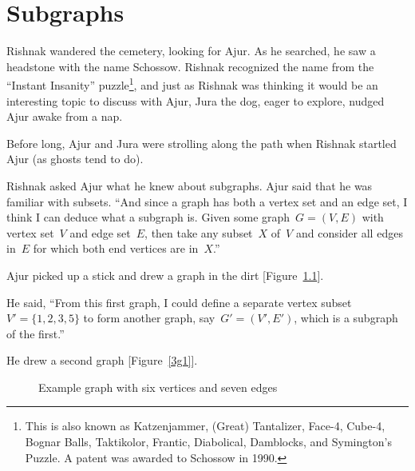 \chapter{Subgraphs}
Rishnak wandered the cemetery, looking for Ajur. As he searched, he saw a headstone with the name Schossow. Rishnak recognized the name from the ``Instant Insanity'' puzzle{\footnote{This is also known as Katzenjammer, (Great) Tantalizer, Face-4, Cube-4, Bognar Balls, Taktikolor, Frantic, Diabolical, Damblocks, and Symington's Puzzle. A patent was awarded to Schossow in 1990.}}, and just as Rishnak was thinking it would be an interesting topic to discuss with Ajur, Jura the dog, eager to explore, nudged Ajur awake from a nap.

Before long, Ajur and Jura were strolling along the path when Rishnak startled Ajur (as ghosts tend to do).

Rishnak asked Ajur what he knew about subgraphs. Ajur said that he was familiar with subsets. ``And since a graph has both a vertex set and an edge set, I think I can deduce what a subgraph is. Given some graph~$G=(V,E)$ with vertex set~$V$ and edge set~$E$, then take any subset~$X$ of~$V$ and consider all edges in~$E$ for which both end vertices are in~$X$.''

Ajur picked up a stick and drew a graph in the dirt [Figure~\ref{3g}].

He said, ``From this first graph, I could define a separate vertex subset~$V'=\{1,2,3,5\}$ to form another graph, say~$G'=(V',E')$, which is a subgraph of the first.''

He drew a second graph [Figure~\ref{3g1}].

\begin{figure}
\begin{center}
\caption{Example graph with six vertices and seven edges}\label{3g}
\end{center}
\end{figure}


